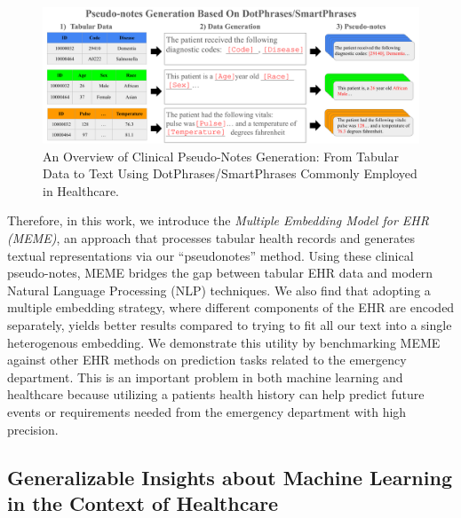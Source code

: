 \documentclass{article}
\theoremstyle{plain}
\theoremstyle{definition}
\theoremstyle{remark}
\begin{document}
 \begin{figure}[t]
   \centering 
   \includegraphics[width=6in]{plots/pseudo.png} 
   \caption{An Overview of Clinical Pseudo-Notes Generation: From Tabular Data to Text Using DotPhrases/SmartPhrases Commonly Employed in Healthcare.}
   \label{fig11} 
 \end{figure} 

Therefore, in this work, we introduce the \textit{Multiple Embedding Model for EHR (MEME)}, an approach that processes tabular health records and generates textual representations via our ``pseudonotes'' method. Using these clinical pseudo-notes, MEME bridges the gap between tabular EHR data and modern Natural Language Processing (NLP) techniques. We also find that adopting a multiple embedding strategy, where different components of the EHR are encoded separately, yields better results compared to trying to fit all our text into a single heterogenous embedding. We demonstrate this utility by benchmarking MEME against other EHR methods on prediction tasks related to the emergency department. This is an important problem in both machine learning and healthcare because utilizing a patients health history can help predict future events or requirements needed from the emergency department with high precision.

\subsection*{Generalizable Insights about Machine Learning in the Context of Healthcare}
\end{document}
